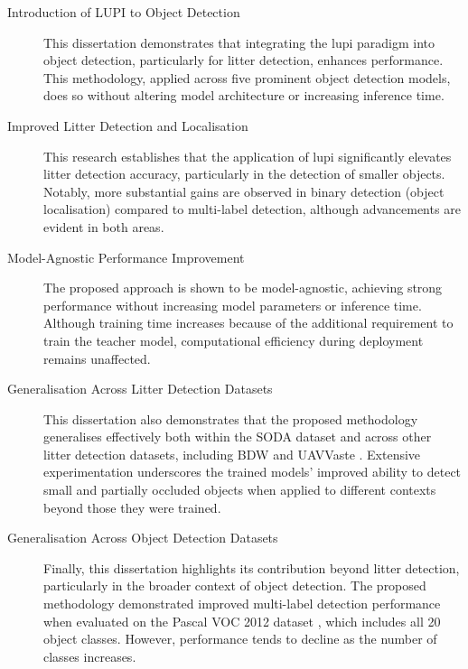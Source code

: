 \begin{description}
    \item [Introduction of LUPI to Object Detection]  
    This dissertation demonstrates that integrating the \gls{lupi} paradigm into object detection, particularly for litter detection, enhances performance. This methodology, applied across five prominent object detection models, does so without altering model architecture or increasing inference time.

    \item [Improved Litter Detection and Localisation]  
    This research establishes that the application of \gls{lupi} significantly elevates litter detection accuracy, particularly in the detection of smaller objects. Notably, more substantial gains are observed in binary detection (object localisation) compared to multi-label detection, although advancements are evident in both areas.

    \item [Model-Agnostic Performance Improvement]  
    The proposed approach is shown to be model-agnostic, achieving strong performance without increasing model parameters or inference time. Although training time increases because of the additional requirement to train the teacher model, computational efficiency during deployment remains unaffected.

    \item [Generalisation Across Litter Detection Datasets]  
    This dissertation also demonstrates that the proposed methodology generalises effectively both within the SODA dataset \cite{soda_dataset} and across other litter detection datasets, including BDW \cite{bdwdataset} and UAVVaste \cite{uavvaste}. Extensive experimentation underscores the trained models' improved ability to detect small and partially occluded objects when applied to different contexts beyond those they were trained.

    \item [Generalisation Across Object Detection Datasets]  
    Finally, this dissertation highlights its contribution beyond litter detection, particularly in the broader context of object detection. The proposed methodology demonstrated improved multi-label detection performance when evaluated on the Pascal VOC 2012 dataset \cite{pascal-voc-2012}, which includes all 20 object classes. However, performance tends to decline as the number of classes increases.


\end{description}


